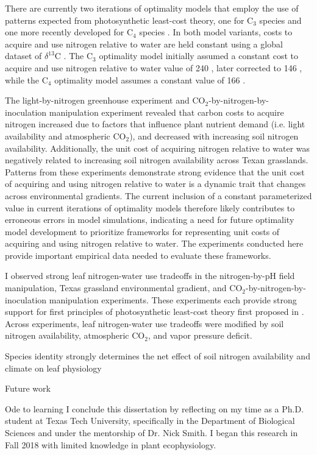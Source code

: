 There are currently two iterations of optimality models that employ the use of patterns expected from photosynthetic least-cost theory, one for C$_3$ species  and one more recently developed for C$_4$ species . In both model variants, costs to acquire and use nitrogen relative to water are held constant using a global dataset of $\delta^{13}$C . The C$_3$ optimality model initially assumed a constant cost to acquire and use nitrogen relative to water value of 240 , later corrected to 146 , while the C$_4$ optimality model assumes a constant value of 166 .

The light-by-nitrogen greenhouse experiment and CO$_2$-by-nitrogen-by- inoculation manipulation experiment revealed that carbon costs to acquire nitrogen increased due to factors that influence plant nutrient demand (i.e. light availability and atmospheric CO$_2$), and decreased with increasing soil nitrogen availability. Additionally, the unit cost of acquiring nitrogen relative to water was negatively related to increasing soil nitrogen availability across Texan grasslands. Patterns from these experiments demonstrate strong evidence that the unit cost of acquiring and using nitrogen relative to water is a dynamic trait that changes across environmental gradients. The current inclusion of a constant parameterized value in current iterations of optimality models therefore likely contributes to erroneous errors in model simulations, indicating a need for future optimality model development to prioritize frameworks for representing unit costs of acquiring and using nitrogen relative to water. The experiments conducted here provide important empirical data needed to evaluate these frameworks.

I observed strong leaf nitrogen-water use tradeoffs in the nitrogen-by-pH field manipulation, Texas grassland environmental gradient, and CO$_2$-by-nitrogen-by-inoculation manipulation experiments. These experiments each provide strong support for first principles of photosynthetic least-cost theory first proposed in . Across experiments, leaf nitrogen-water use tradeoffs were modified by soil nitrogen availability, atmospheric CO$_2$, and vapor pressure deficit.


Species identity strongly determines the net effect of soil nitrogen availability and climate on leaf physiology

Future work

Ode to learning
I conclude this dissertation by reflecting on my time as a Ph.D. student at Texas Tech University, specifically in the Department of Biological Sciences and under the mentorship of Dr. Nick Smith. I began this research in Fall 2018 with limited knowledge in plant ecophysiology.